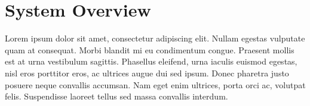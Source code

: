 \documentclass[../thesis.tex]{subfiles}
\begin{document}
\chapter{System Overview}

Lorem ipsum dolor sit amet, consectetur adipiscing elit. Nullam egestas vulputate quam at consequat. Morbi blandit mi eu condimentum congue. Praesent mollis est at urna vestibulum sagittis. Phasellus eleifend, urna iaculis euismod egestas, nisl eros porttitor eros, ac ultrices augue dui sed ipsum. Donec pharetra justo posuere neque convallis accumsan. Nam eget enim ultrices, porta orci ac, volutpat felis. Suspendisse laoreet tellus sed massa convallis interdum.
\end{document}
